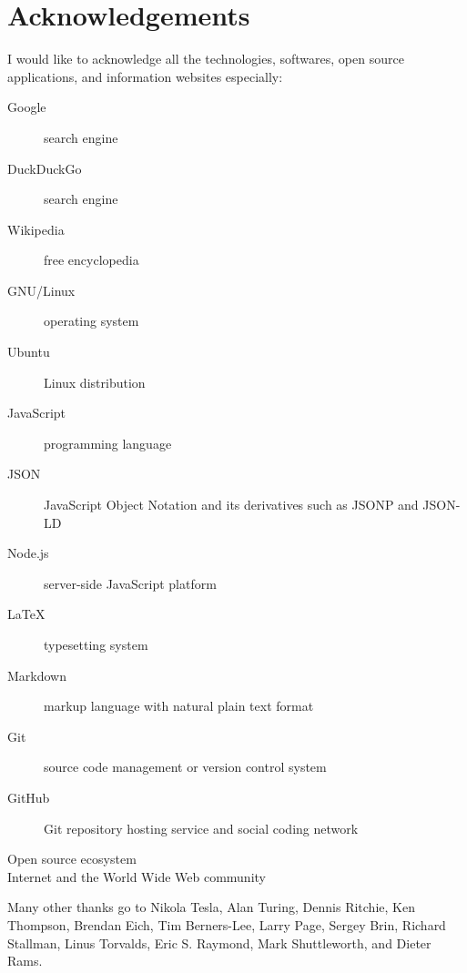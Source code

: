
\begingroup
\let\clearpage\relax
\let\cleardoublepage\relax

\chapter*{Acknowledgements}
\label{chap:acknowledgements}

I would like to acknowledge all the technologies, softwares, open source applications, and information websites especially:

\begin{description}
  \item[Google] search engine
  \item[DuckDuckGo] search engine
  \item[Wikipedia] free encyclopedia
  \item[GNU/Linux] operating system
  \item[Ubuntu] Linux distribution
  \item[JavaScript] programming language
  \item[JSON] JavaScript Object Notation and its derivatives such as JSONP and JSON-LD
  \item[Node.js] server-side JavaScript platform
  \item[LaTeX] typesetting system
  \item[Markdown] markup language with natural plain text format
  \item[Git] source code management or version control system
  \item[GitHub] Git repository hosting service and social coding network
  \item[Open source ecosystem]
  \item[Internet and the World Wide Web community]
\end{description}

\noindent Many other thanks go to Nikola Tesla, Alan Turing, Dennis Ritchie, Ken Thompson, Brendan Eich, Tim Berners-Lee, Larry Page, Sergey Brin, Richard Stallman, Linus Torvalds, Eric S. Raymond, Mark Shuttleworth, and Dieter Rams.

\endgroup

